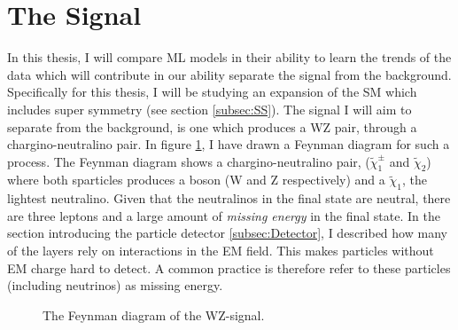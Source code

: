 \section{The Signal}\label{sec:signal}
In this thesis, I will compare \ac{ML} models in their ability to learn the trends of the data which will contribute  
in our ability separate the signal from the background. Specifically for this thesis, I will be studying an expansion of the 
\ac{SM} which includes super symmetry (see section \ref{subsec:SS}). The signal I will aim to separate from the background, is one 
which produces a WZ pair, through a chargino-neutralino pair. In figure \ref{fig:signal}, I have drawn a Feynman diagram for 
such a process. The Feynman diagram shows a chargino-neutralino pair, ($\tilde{\chi}_1^\pm$ and $\tilde{\chi}_2$)
where both sparticles produces a boson (W and Z respectively) and a $\tilde{\chi}_1$, the lightest neutralino. Given that the 
neutralinos in the final state are neutral, there are three leptons and a large amount of \emph{missing energy} in the final state.
In the section introducing the particle detector \ref{subsec:Detector}, I described how many of the layers rely on interactions in 
the \ac{EM} field. This makes particles without \ac{EM} charge hard to detect. A common practice is therefore refer to these particles 
(including neutrinos) as missing energy.
\begin{figure}[H]
    \centering
    \caption{The Feynman diagram of the WZ-signal.}
    \label{fig:signal}
\end{figure}